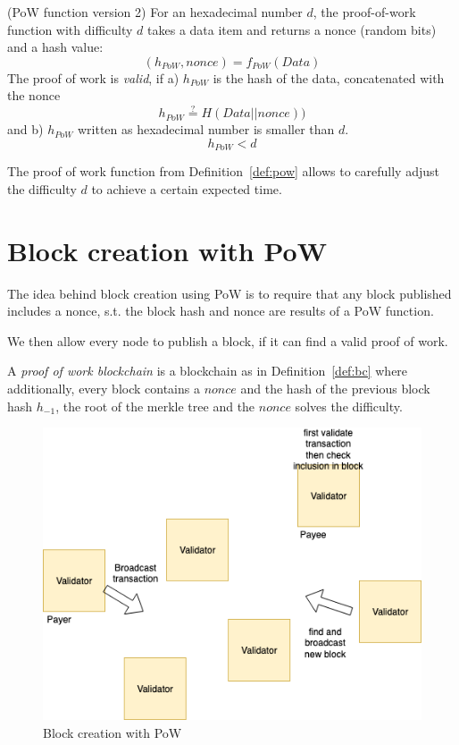\begin{definition}\label{def:pow}
	(PoW function version 2)
	For an hexadecimal number $d$,
	the proof-of-work function with difficulty $d$ takes a data item and returns a nonce (random bits) and a hash value:
	\[
		(h_{PoW}, nonce)=f_{PoW}(Data)
	\]
	The proof of work is \emph{valid}, if a) $h_{PoW}$ is the hash of the data, concatenated with the nonce
	\[
		h_{PoW} \overset{?}{=}H(Data || nonce))
	\]
	and b)  $h_{PoW}$ written as hexadecimal number is smaller than $d$.
	\[
		h_{PoW} < d
	\]
\end{definition}


\begin{note}
	The proof of work function from Definition~\ref{def:pow} allows to carefully adjust the difficulty $d$ to achieve a certain expected time.
\end{note}

\section{Block creation with PoW}

\begin{idea}
	The idea behind block creation using PoW is to require that any block published includes a nonce, s.t. the block hash and nonce are results of a PoW function.
	
	We then allow every node to publish a block, if it can find a valid proof of work.
\end{idea}

\begin{definition}
A \emph{proof of work blockchain} is a blockchain as in Definition~\ref{def:bc} where additionally, every block contains a $nonce$ and the hash of the previous block hash $h_{-1}$, the root of the merkle tree and the $nonce$ solves the difficulty.	
\end{definition}

\begin{figure}
	\includegraphics[width=\linewidth]{fig/NoLeader}
	\caption{Block creation with PoW}
	\label{fig:leader}
\end{figure}

